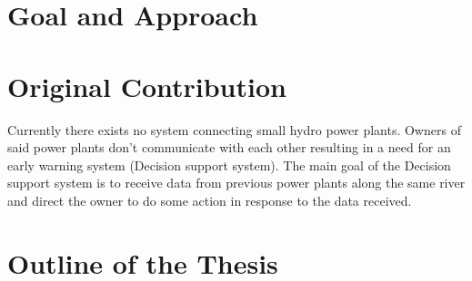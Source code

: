 \section{Goal and Approach}
\label{sec:GoalAndApproach}
\section{Original Contribution}
\label{sec:OriginalContribution}
\indent Currently there exists no system connecting small hydro power plants. Owners of said power plants don't communicate with each other resulting in a need for an early warning system (Decision support system). The main goal of the Decision support system is to receive data from previous power plants along the same river and direct the owner to do some action in response to the data received.\\
\section{Outline of the Thesis}
\label{sec:OutlineOfTheThesis}